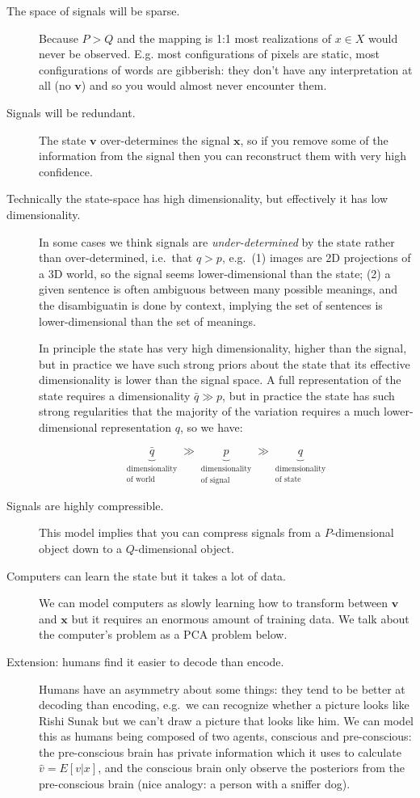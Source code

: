 \documentclass[
  10pt,
  letterpaper,
  DIV=11,
  numbers=noendperiod,
  oneside]{scrartcl}
\newcommand{\bm}[1]{\boldsymbol{#1}}
\newcommand{\utt}[3]{\underbrace{#1}_{\substack{\text{#2}\\\text{#3}}}}
\begin{document}
\begin{description}
\item[The space of signals will be sparse.]
Because \(P>Q\) and the mapping is 1:1 most realizations of \(x\in X\)
would never be observed. E.g. most configurations of pixels are static,
most configurations of words are gibberish: they don't have any
interpretation at all (no \(\bm{v}\)) and so you would almost never
encounter them.
\item[Signals will be redundant.]
The state \(\bm{v}\) over-determines the signal \(\bm{x}\), so if you
remove some of the information from the signal then you can reconstruct
them with very high confidence.
\item[Technically the state-space has high dimensionality, but
effectively it has low dimensionality.]
In some cases we think signals are \emph{under-determined} by the state
rather than over-determined, i.e.~that \(q>p\), e.g.~(1) images are 2D
projections of a 3D world, so the signal seems lower-dimensional than
the state; (2) a given sentence is often ambiguous between many possible
meanings, and the disambiguatin is done by context, implying the set of
sentences is lower-dimensional than the set of meanings.

In principle the state has very high dimensionality, higher than the
signal, but in practice we have such strong priors about the state that
its effective dimensionality is lower than the signal space. A full
representation of the state requires a dimensionality \(\bar{q}\gg p\),
but in practice the state has such strong regularities that the majority
of the variation requires a much lower-dimensional representation \(q\),
so we have:

\[\utt{\bar{q}}{dimensionality}{of world}\gg 
   \utt{p}{dimensionality}{of signal} \gg
   \utt{q}{dimensionality}{of state}\]
\item[Signals are highly compressible.]
This model implies that you can compress signals from a
\(P\)-dimensional object down to a \(Q\)-dimensional object.
\item[Computers can learn the state but it takes a lot of data.]
We can model computers as slowly learning how to transform between
\(\bm{v}\) and \(\bm{x}\) but it requires an enormous amount of training
data. We talk about the computer's problem as a PCA problem below.
\item[Extension: humans find it easier to decode than encode.]
Humans have an asymmetry about some things: they tend to be better at
decoding than encoding, e.g.~we can recognize whether a picture looks
like Rishi Sunak but we can't draw a picture that looks like him. We can
model this as humans being composed of two agents, conscious and
pre-conscious: the pre-conscious brain has private information which it
uses to calculate \(\hat{v}=E[v|x]\), and the conscious brain only
observe the posteriors from the pre-conscious brain (nice analogy: a
person with a sniffer dog).
\end{description}
\end{document}
